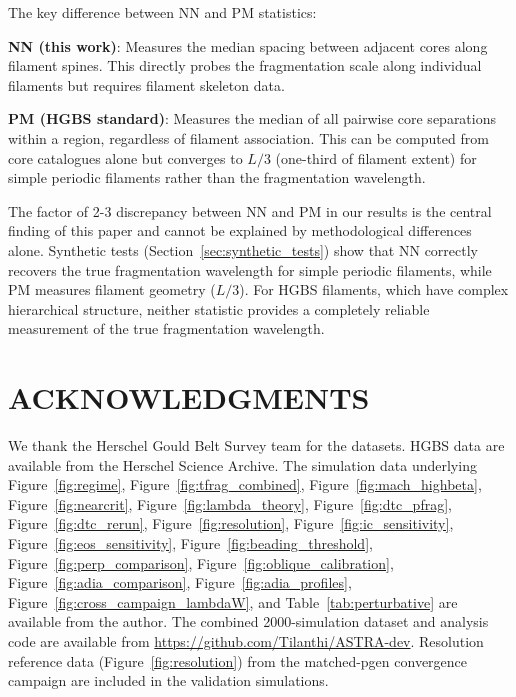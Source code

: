 \documentclass[twoside,twocolumn]{mnras}
\begin{document}
The key difference between NN and PM statistics:

\textbf{NN (this work)}: Measures the median spacing between adjacent cores along filament spines. This directly probes the fragmentation scale along individual filaments but requires filament skeleton data.

\textbf{PM (HGBS standard)}: Measures the median of all pairwise core separations within a region, regardless of filament association. This can be computed from core catalogues alone but converges to $L/3$ (one-third of filament extent) for simple periodic filaments rather than the fragmentation wavelength.

The factor of 2-3 discrepancy between NN and PM in our results is the central finding of this paper and cannot be explained by methodological differences alone. Synthetic tests (Section~\ref{sec:synthetic_tests}) show that NN correctly recovers the true fragmentation wavelength for simple periodic filaments, while PM measures filament geometry ($L/3$). For HGBS filaments, which have complex hierarchical structure, neither statistic provides a completely reliable measurement of the true fragmentation wavelength.

\section*{ACKNOWLEDGMENTS}

We thank the Herschel Gould Belt Survey team for the datasets. HGBS data are available from the Herschel Science Archive. The simulation data underlying Figure~\ref{fig:regime}, Figure~\ref{fig:tfrag_combined}, Figure~\ref{fig:mach_highbeta}, Figure~\ref{fig:nearcrit}, Figure~\ref{fig:lambda_theory}, Figure~\ref{fig:dtc_pfrag}, Figure~\ref{fig:dtc_rerun}, Figure~\ref{fig:resolution}, Figure~\ref{fig:ic_sensitivity}, Figure~\ref{fig:eos_sensitivity}, Figure~\ref{fig:beading_threshold}, Figure~\ref{fig:perp_comparison}, Figure~\ref{fig:oblique_calibration}, Figure~\ref{fig:adia_comparison}, Figure~\ref{fig:adia_profiles}, Figure~\ref{fig:cross_campaign_lambdaW}, and Table~\ref{tab:perturbative} are available from the author. The combined 2000-simulation dataset and analysis code are available from \url{https://github.com/Tilanthi/ASTRA-dev}. Resolution reference data (Figure~\ref{fig:resolution}) from the  matched-pgen convergence campaign are included in the validation simulations.



\end{document}
